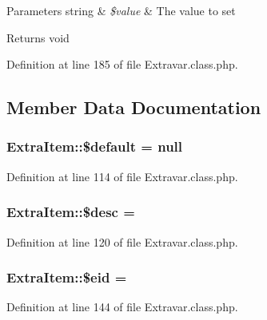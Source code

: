 \begin{DoxyParams}[1]{Parameters}
string & {\em \$value} & The value to set \\
\hline
\end{DoxyParams}
\begin{DoxyReturn}{Returns}
void 
\end{DoxyReturn}


Definition at line 185 of file Extravar.\+class.\+php.



\subsection{Member Data Documentation}
\hypertarget{classExtraItem_a8499b54a8ec7aa3e3a40201d1458ffe5}{}
\subsubsection[{\$default}]{\setlength{\rightskip}{0pt plus 5cm}Extra\+Item\+::\$default = null}\label{classExtraItem_a8499b54a8ec7aa3e3a40201d1458ffe5}


Definition at line 114 of file Extravar.\+class.\+php.

\hypertarget{classExtraItem_a47059cf3ac48f0d31c5358fa5e97f106}{}
\subsubsection[{\$desc}]{\setlength{\rightskip}{0pt plus 5cm}Extra\+Item\+::\$desc = \textquotesingle{}\textquotesingle{}}\label{classExtraItem_a47059cf3ac48f0d31c5358fa5e97f106}


Definition at line 120 of file Extravar.\+class.\+php.

\hypertarget{classExtraItem_a8a68f26bb602679ebf4095e774425092}{}
\subsubsection[{\$eid}]{\setlength{\rightskip}{0pt plus 5cm}Extra\+Item\+::\$eid = \textquotesingle{}\textquotesingle{}}\label{classExtraItem_a8a68f26bb602679ebf4095e774425092}


Definition at line 144 of file Extravar.\+class.\+php.

